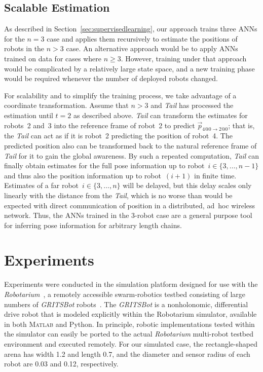 \documentclass[letterpaper, 10 pt, conference]{ieeeconf}  %
\begin{document}
	\subsection{Scalable Estimation}
	\label{sec:scalableestimation}
	
	As described in Section~\ref{sec:supervisedlearning}, our approach
	trains three ANNs for the $n=3$ case and applies them recursively to
	estimate the positions of robots in the $n>3$ case. An alternative
	approach would be to apply ANNs trained on data for cases where
	$n\geq 3$. However, training under that approach would be complicated by a
	relatively large state space, and a new training phase would be required
	whenever the number of deployed robots changed.
	
	For scalability and to simplify the training process, we take advantage
	of a coordinate transformation. Assume that $n>3$ and \emph{Tail} has
	processed the estimation until $t=2$ as described above. \emph{Tail} can
	transform the estimates for robots~2 and~3 into the reference frame of
	robot~2 to predict $\vec{p}_{4@0\to 2@0}$; that is, the \emph{Tail} can
	act as if it is robot~2 predicting the position of robot~4. The
	predicted position also can be transformed back to the natural reference
	frame of \emph{Tail} for it to gain the global awareness. By such a
	repeated computation, \emph{Tail} can finally obtain estimates for the
	full pose information up to robot~$i \in \{3,\ldots,n-1\}$ and thus also
	the position information up to robot~$(i+1)$ in finite time. Estimates
	of a far robot~$i \in \{3,\ldots,n\}$ will be delayed, but this delay
	scales only linearly with the distance from the \emph{Tail}, which is no
	worse than would be expected with direct communication of position in a
	distributed, ad~hoc wireless network. Thus, the ANNs trained in the
	3-robot case are a general purpose tool for inferring pose information
	for arbitrary length chains.
	
	\section{Experiments}
	\label{sec:experiments}
	
	Experiments were conducted in the simulation platform designed for use
	with the \emph{Robotarium}~\cite{PWGDMAFE16}, a remotely accessible
	swarm-robotics testbed consisting of large numbers of \emph{GRITSBot}
	robots~\cite{PLE15}. The \emph{GRITSBot} is a nonholonomic, differential
	drive robot that is modeled explicitly within the Robotarium simulator,
	available in both \textsc{Matlab} and Python. In principle, robotic
	implementations tested within the simulator can easily be ported to the
	actual \emph{Robotarium} multi-robot testbed environment and executed
	remotely. For our simulated case, the rectangle-shaped arena has width
	1.2 and length 0.7, and the diameter and sensor radius of each robot
	are 0.03 and 0.12, respectively.
	
\end{document}
